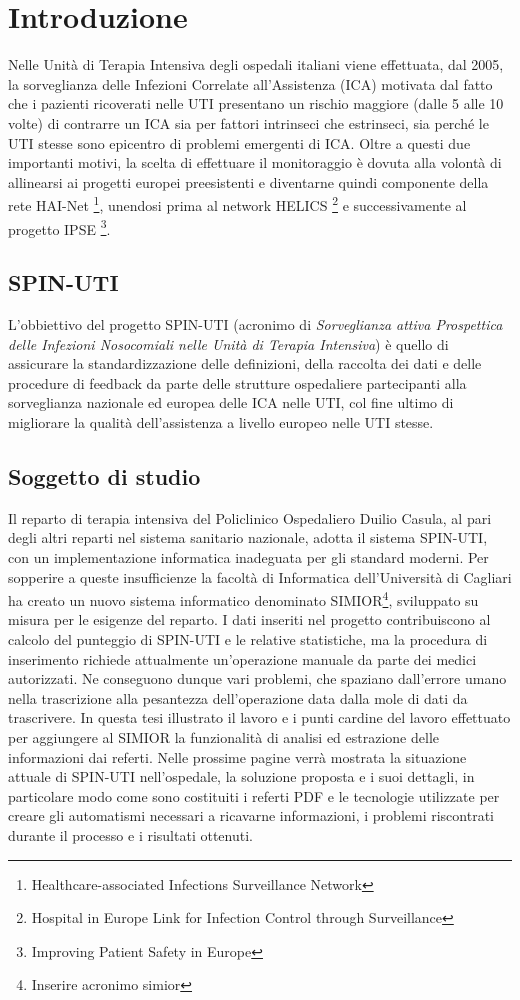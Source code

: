 \chapter{Introduzione}
Nelle Unità di Terapia Intensiva degli ospedali italiani viene effettuata, dal 2005, la sorveglianza delle Infezioni Correlate all'Assistenza (ICA) motivata dal fatto che i pazienti ricoverati nelle UTI presentano un rischio maggiore (dalle 5 alle 10 volte) di contrarre un ICA sia per fattori intrinseci che estrinseci, sia perché le UTI stesse sono epicentro di problemi emergenti di ICA. Oltre a questi due importanti motivi, la scelta di effettuare il monitoraggio è dovuta alla volontà di allinearsi ai progetti europei preesistenti e diventarne quindi componente della rete HAI-Net \footnote{Healthcare-associated Infections Surveillance Network},  
unendosi prima al network HELICS \footnote{Hospital in Europe Link for Infection Control through Surveillance} e successivamente al progetto IPSE \footnote{Improving Patient Safety in Europe}.
\section{SPIN-UTI}
L'obbiettivo del progetto SPIN-UTI (acronimo di \textit{Sorveglianza attiva Prospettica delle Infezioni Nosocomiali nelle Unità di Terapia Intensiva}) è quello di assicurare la standardizzazione delle definizioni, della raccolta dei dati e delle procedure di feedback da parte delle strutture ospedaliere partecipanti alla sorveglianza nazionale ed europea delle ICA nelle UTI, col fine ultimo di migliorare la qualità dell'assistenza a livello europeo nelle UTI stesse.
\newpage
\section{Soggetto di studio}
Il reparto di terapia intensiva del Policlinico Ospedaliero Duilio Casula, al pari degli altri reparti nel sistema sanitario nazionale, adotta il sistema SPIN-UTI, con un 
implementazione informatica inadeguata per gli standard moderni. Per sopperire a queste insufficienze la facoltà di Informatica dell'Università di Cagliari ha creato un nuovo sistema informatico denominato SIMIOR\footnote{Inserire acronimo simior}, sviluppato su misura per le esigenze del reparto. I dati inseriti nel progetto contribuiscono al calcolo del punteggio di SPIN-UTI e le relative statistiche, ma la procedura di inserimento richiede attualmente un'operazione manuale da parte dei medici autorizzati. Ne conseguono dunque vari problemi, che spaziano dall'errore umano nella trascrizione alla pesantezza dell'operazione data dalla mole di dati da trascrivere.
In questa tesi illustrato il lavoro e i punti cardine del lavoro effettuato per aggiungere al SIMIOR la funzionalità di analisi ed estrazione delle informazioni dai referti. Nelle prossime pagine verrà mostrata la situazione attuale di SPIN-UTI nell'ospedale, la soluzione proposta e i suoi dettagli, in particolare modo come sono costituiti i referti PDF e le tecnologie utilizzate per creare gli automatismi necessari a ricavarne informazioni, i problemi riscontrati durante il processo e i risultati ottenuti.



